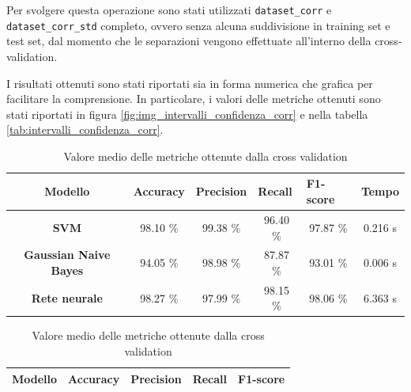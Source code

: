 Per svolgere questa operazione sono stati utilizzati \texttt{dataset\_corr} e
\texttt{dataset\_corr\_std} completo, ovvero senza alcuna suddivisione in training
set e test set, dal momento che le separazioni vengono effettuate all'interno
della cross-validation.

I risultati ottenuti sono stati riportati sia in forma numerica che grafica
per facilitare la comprensione. In particolare, i valori delle metriche ottenuti
sono stati riportati in figura \ref{fig:img_intervalli_confidenza_corr} e
nella tabella \ref{tab:intervalli_confidenza_corr}.
\begin{table}[!ht]
    \begin{subtable}[h]{1\textwidth}
        \centering
        \begin{tabular}{@{}clllll@{}}
            \toprule
            \rowcolor[HTML]{EFEFEF}
            \textbf{Modello}                                      & \textbf{Accuracy}            & \textbf{Precision}           & \textbf{Recall}              & \textbf{F1-score}            & \textbf{Tempo}              \\ \midrule
            \cellcolor[HTML]{EFEFEF}\textbf{SVM}                  & \multicolumn{1}{c}{98.10 \%} & \multicolumn{1}{c}{99.38 \%} & \multicolumn{1}{c}{96.40 \%} & \multicolumn{1}{c}{97.87 \%} & \multicolumn{1}{c}{0.216 s} \\
            \cellcolor[HTML]{EFEFEF}\textbf{Gaussian Naive Bayes} & \multicolumn{1}{c}{94.05 \%} & \multicolumn{1}{c}{98.98 \%} & \multicolumn{1}{c}{87.87 \%} & \multicolumn{1}{c}{93.01 \%} & \multicolumn{1}{c}{0.006 s} \\
            \cellcolor[HTML]{EFEFEF}\textbf{Rete neurale}         & \multicolumn{1}{c}{98.27 \%} & \multicolumn{1}{c}{97.99 \%} & \multicolumn{1}{c}{98.15 \%} & \multicolumn{1}{c}{98.06 \%} & \multicolumn{1}{c}{6.363 s} \\ \bottomrule
        \end{tabular}
        \caption{Valore medio delle metriche ottenute dalla cross validation}
        \label{tab:risultati_cross_val_corr}
    \end{subtable}
    \hfill
    \begin{subtable}[h]{1\textwidth}
        \centering
        \begin{tabular}{@{}cllll@{}}
            \toprule
            \rowcolor[HTML]{EFEFEF}
            \textbf{Modello}                                      & \textbf{Accuracy}  & \textbf{Precision} & \textbf{Recall}    & \textbf{F1-score}  \\ \midrule

\end{tabular}
\end{subtable}
\end{table}
